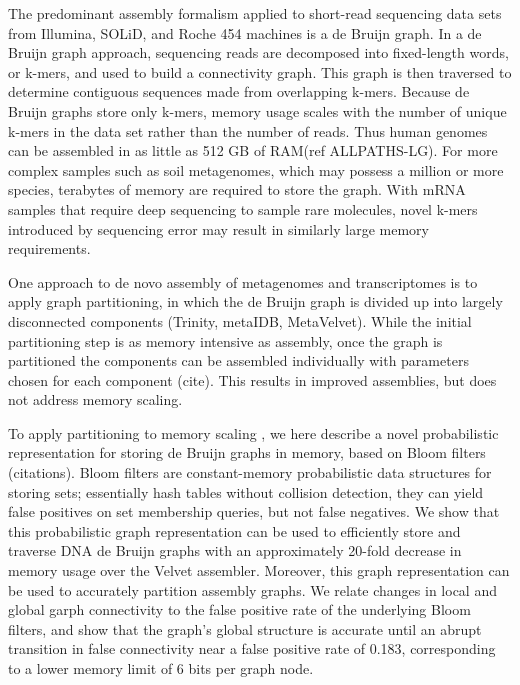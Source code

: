 \documentclass[12pt]{article} \usepackage{simplemargins}
\begin{document}
The predominant assembly formalism applied to short-read sequencing
data sets from Illumina, SOLiD, and Roche 454 machines is a de Bruijn
graph.  In a de Bruijn graph approach, sequencing reads are decomposed
into fixed-length words, or k-mers, and used to build a connectivity
graph.  This graph is then traversed to determine contiguous sequences
made from overlapping k-mers.  Because de Bruijn graphs store only
k-mers, memory usage scales with the number of unique k-mers in the
data set rather than the number of reads.  Thus human genomes can be
assembled in as little as 512 GB of RAM(ref ALLPATHS-LG).  For
more complex samples such as soil metagenomes, which may possess a
million or more species, terabytes of memory are required to store the
graph.  With mRNA samples that require deep sequencing to sample rare
molecules, novel k-mers introduced by sequencing error may result in
similarly large memory requirements.

One approach to de novo assembly of metagenomes and transcriptomes is
to apply graph partitioning, in which the de Bruijn graph is divided
up into largely disconnected components (Trinity, metaIDB,
MetaVelvet).  While the initial partitioning step is as memory
intensive as assembly, once the graph is partitioned the components
can be assembled individually with parameters chosen for each
component (cite).  This results in improved assemblies, but does not
address memory scaling.

To apply partitioning to memory scaling , we here describe a novel
probabilistic representation for storing de Bruijn graphs in memory,
based on Bloom filters (citations).  Bloom filters are constant-memory
probabilistic data structures for storing sets; essentially hash
tables without collision detection, they can yield false positives on
set membership queries, but not false negatives.  We show that this
probabilistic graph representation can be used to efficiently store
and traverse DNA de Bruijn graphs with an approximately 20-fold
decrease in memory usage over the Velvet assembler. Moreover, this
graph representation can be used to accurately partition assembly
graphs.  We relate changes in local and global garph connectivity
to the false positive rate of the underlying Bloom filters, and
show that the graph's global structure is accurate until an abrupt
transition in false connectivity near a false positive rate of 0.183,
corresponding to a lower memory limit of 6 bits per graph node.

\end{document}
